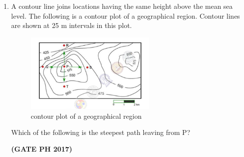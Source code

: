 \documentclass[14pt, a4paper]{extarticle}
\begin{document}
\begin{enumerate}[label=\textbf{Q.\arabic*}]
\item A contour line joins locations having the same height above the mean sea level. The following is a contour plot of a geographical region. Contour lines are shown at 25 m intervals in this plot.
\begin{figure}[H]
\centering
\includegraphics[width=0.6\textwidth]{figs/q65fig17.png}
\caption{contour plot of a geographical region}
\label{fig:q65}
\end{figure}
Which of the following is the steepest path leaving from P?
\begin{enumerate}
\end{enumerate}
\hfill \textbf{(GATE PH 2017)}
    
   

\end{enumerate}
\end{document}
